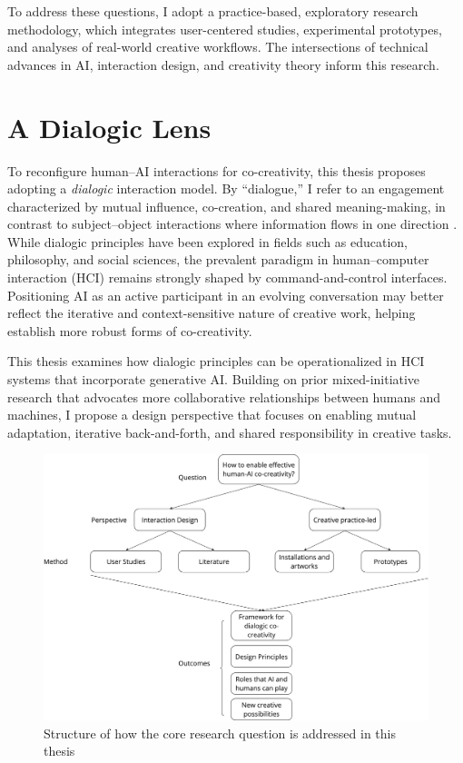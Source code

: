 To address these questions, I adopt a practice-based, exploratory research methodology, which integrates user-centered studies, experimental prototypes, and analyses of real-world creative workflows. The intersections of technical advances in AI, interaction design, and creativity theory inform this research.

\section{A Dialogic Lens}

To reconfigure human--AI interactions for co-creativity, this thesis proposes adopting a \emph{dialogic} interaction model. By “dialogue,” I refer to an engagement characterized by mutual influence, co-creation, and shared meaning-making, in contrast to subject--object interactions where information flows in one direction \cite{Freire1970-pa, Bohm1996-fo, Buber1923-us}. While dialogic principles have been explored in fields such as education, philosophy, and social sciences, the prevalent paradigm in human--computer interaction (HCI) remains strongly shaped by command-and-control interfaces. Positioning AI as an active participant in an evolving conversation may better reflect the iterative and context-sensitive nature of creative work, helping establish more robust forms of co-creativity.

This thesis examines how dialogic principles can be operationalized in HCI systems that incorporate generative AI. Building on prior mixed-initiative research that advocates more collaborative relationships between humans and machines, I propose a design perspective that focuses on enabling mutual adaptation, iterative back-and-forth, and shared responsibility in creative tasks.

\begin{figure}
    \centering
    \includegraphics[width=0.75\linewidth]{researchstructure.png}
    \caption{Structure of how the core research question is addressed in this thesis}
    \label{fig:enter-label}
\end{figure}








